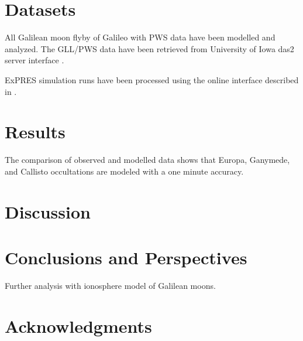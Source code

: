 \documentclass[referee]{aa}
\begin{document}
\section{Datasets}
All Galilean moon flyby of Galileo with PWS data have been modelled and analyzed. The GLL/PWS data have been retrieved from University of Iowa das2 server interface \cite{piker_2019}.  

ExPRES simulation runs have been processed using the online interface described in \citet{Louis_AA_2019}. 


\section{Results}
The comparison of observed and modelled data shows that Europa, Ganymede, and Callisto occultations are modeled with a one minute accuracy. 

\section{Discussion}

\section{Conclusions and Perspectives}

Further analysis with ionosphere model of Galilean moons.

\section*{Acknowledgments}



\end{document}
